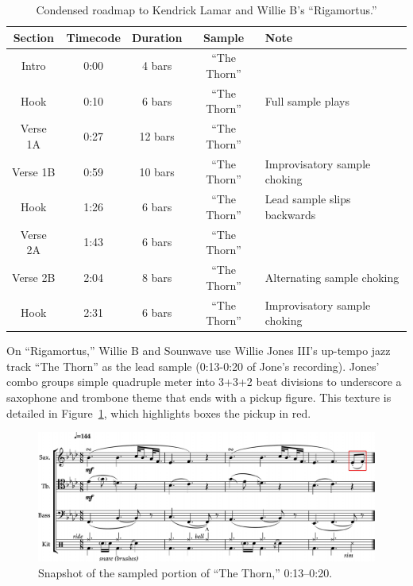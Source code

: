     \begin{table}[ht]
        \centering
            \begin{tabular}{|c|c|c|c|l|}
                \hline
                Section  & Timecode & Duration & Sample        & Note \\ \hline
                Intro    & 0:00     & 4 bars   & ``The Thorn'' & \\ \hline
                Hook     & 0:10     & 6 bars   & ``The Thorn'' & Full sample plays \\ \hline
                Verse 1A & 0:27     & 12 bars  & ``The Thorn'' & \\ \hline
                Verse 1B & 0:59     & 10 bars  & ``The Thorn'' & Improvisatory sample choking \\ \hline
                Hook     & 1:26     & 6 bars   & ``The Thorn'' & Lead sample slips backwards \\ \hline
                Verse 2A & 1:43     & 6 bars   & ``The Thorn'' & \\ \hline
                Verse 2B & 2:04     & 8 bars   & ``The Thorn'' & Alternating sample choking \\ \hline
                Hook     & 2:31     & 6 bars   & ``The Thorn'' & Improvisatory sample choking\\ \hline
            \end{tabular}
        \caption{Condensed roadmap to Kendrick Lamar and Willie B's ``Rigamortus.''}
        \label{tab:rigamortus}
    \end{table}

On ``Rigamortus,'' Willie B and Sounwave use Willie Jones  III's up-tempo jazz track ``The Thorn''
as the lead sample (0:13-0:20 of Jone's recording). Jones' combo groups simple quadruple meter 
into 3+3+2 beat divisions to underscore a saxophone and trombone theme that ends with a pickup
figure. This texture is detailed in Figure~\ref{fig:thethornfull}, which highlights boxes the
pickup in red.

    \begin{figure}[ht]
        \centering
        \includegraphics[width=\textwidth]{images/figures/chp 02/013020thethornfull.pdf}
        \caption{Snapshot of the sampled portion of ``The Thorn,'' 0:13--0:20.}
        \label{fig:thethornfull}
    \end{figure}

